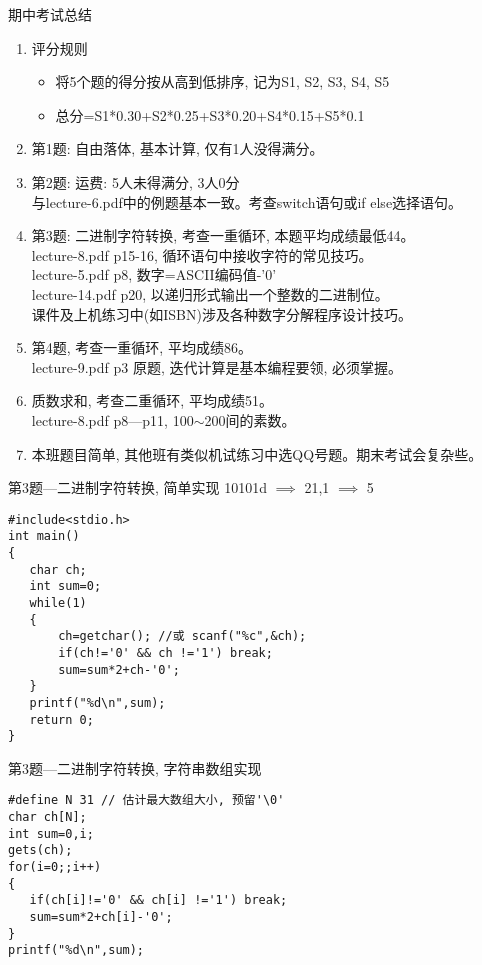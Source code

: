 \begin{frame}{期中考试总结}
\begin{enumerate}
	\item 评分规则
	\begin{itemize}
		\item 将5个题的得分按从高到低排序, 记为S1, S2, S3, S4, S5
		\item 总分=S1*0.30+S2*0.25+S3*0.20+S4*0.15+S5*0.1
	\end{itemize}
	\item 第1题: 自由落体, 基本计算, 仅有1人没得满分。
	\item 第2题: 运费: 5人未得满分, 3人0分\\ 
	与lecture-6.pdf中的例题基本一致。考查switch语句或if else选择语句。
	\item 第3题: 二进制字符转换, 考查一重循环, 本题平均成绩最低44。\\
	lecture-8.pdf p15-16, 循环语句中接收字符的常见技巧。\\
	lecture-5.pdf p8, 数字=ASCII编码值-'0'\\
	lecture-14.pdf p20, 以递归形式输出一个整数的二进制位。\\
	课件及上机练习中(如ISBN)涉及各种数字分解程序设计技巧。
	\item 第4题, 考查一重循环, 平均成绩86。\\
	lecture-9.pdf p3 原题, 迭代计算是基本编程要领, 必须掌握。
	\item 质数求和, 考查二重循环, 平均成绩51。\\
	lecture-8.pdf p8---p11, 100$\sim$200间的素数。
	\item 本班题目简单, 其他班有类似机试练习中选QQ号题。期末考试会复杂些。
\end{enumerate}
\end{frame}

\begin{frame}{第3题---二进制字符转换, 简单实现}
10101d $\implies$ 21,1  $\implies$ 5
\begin{lstlisting}
#include<stdio.h>
int main()
{
   char ch;
   int sum=0;
   while(1)
   {
       ch=getchar(); //或 scanf("%c",&ch);
       if(ch!='0' && ch !='1') break;
       sum=sum*2+ch-'0';
   } 
   printf("%d\n",sum);
   return 0;
}
\end{lstlisting}
\end{frame}

\begin{frame}[fragile]{第3题---二进制字符转换, 字符串数组实现}
\begin{lstlisting}
#define N 31 // 估计最大数组大小, 预留'\0'
char ch[N];
int sum=0,i;
gets(ch);
for(i=0;;i++)
{
   if(ch[i]!='0' && ch[i] !='1') break;
   sum=sum*2+ch[i]-'0';
} 
printf("%d\n",sum);
\end{lstlisting}
\end{frame}

